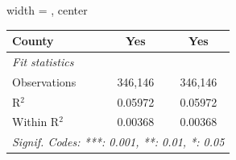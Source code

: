\begin{adjustbox}{width = \textwidth, center}
\begin{tabular}{lcc}
      County                                                                                           & Yes                     & Yes\\  
      \midrule
      \emph{Fit statistics}\\
      Observations                                                                                     & 346,146                 & 346,146\\  
      R$^2$                                                                                            & 0.05972                 & 0.05972\\  
      Within R$^2$                                                                                     & 0.00368                 & 0.00368\\  
      \midrule \midrule
      \multicolumn{3}{l}{\emph{Signif. Codes: ***: 0.001, **: 0.01, *: 0.05}}\\
   \end{tabular}
\end{adjustbox}
\par\endgroup


